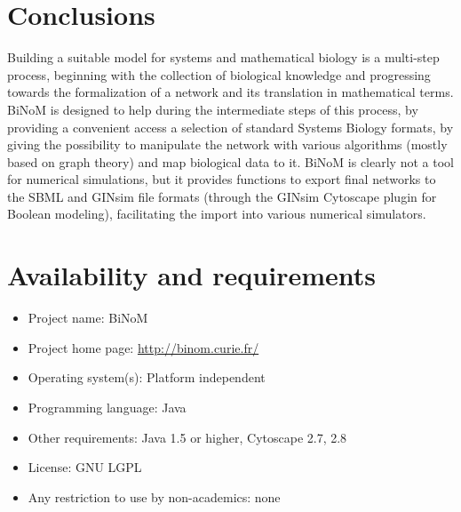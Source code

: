 \documentclass[10pt]{bmc_article}
\newenvironment{bmcformat}{\baselineskip20pt\sloppy\setboolean{publ}{false}}{\baselineskip20pt\sloppy}
\begin{document}
\begin{bmcformat}
\section*{Conclusions}

Building a suitable model for systems and mathematical biology is a multi-step
process, beginning with the collection of biological knowledge and progressing
towards the formalization of a network and its translation in mathematical
terms. BiNoM is designed to help during the intermediate steps of this process,
by providing a convenient access a selection of standard Systems Biology
formats, by giving the possibility to manipulate the
network with various algorithms (mostly based on graph theory)
and map biological data to it. BiNoM is clearly not a tool for numerical
simulations, but it provides functions to export final networks to the SBML and
GINsim file formats (through the GINsim Cytoscape plugin for Boolean modeling), facilitating the
import into various numerical simulators.

\section*{Availability and requirements}

\begin{itemize}
\item Project name: BiNoM
\item Project home page: \url{http://binom.curie.fr/}
\item Operating system(s): Platform independent
\item Programming language: Java
\item Other requirements: Java 1.5 or higher, Cytoscape 2.7, 2.8
\item License: GNU LGPL
\item Any restriction to use by non-academics: none
\end{itemize}




\end{bmcformat}
\end{document}

